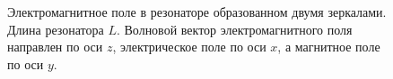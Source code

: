 \begin{figure}
\centering



\caption{Электромагнитное поле в резонаторе образованном двумя
   зеркалами. Длина резонатора $L$. Волновой вектор электромагнитного
   поля направлен по оси $z$, электрическое поле по оси $x$, а
   магнитное поле по оси $y$.}
\label{figCh1_Res}
\end{figure}
